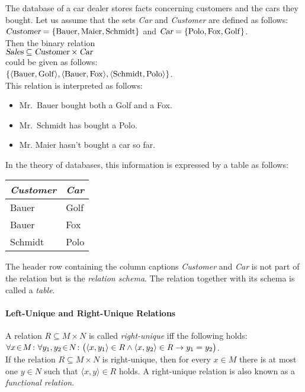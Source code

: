\example
The database of a car dealer stores facts concerning customers and the cars they bought.
Let us assume that the sets \textsl{Car} and \textsl{Customer} are defined as follows:
\\[0.2cm]
\hspace*{1.3cm}
$\textsl{Customer} = \{ \mathrm{Bauer}, \mathrm{Maier}, \mathrm{Schmidt} \}$
\quad and \quad
$\textsl{Car} = \{ \mathrm{Polo}, \mathrm{Fox}, \mathrm{Golf} \}$.
\\[0.2cm]
Then the binary relation 
\\[0.2cm]
\hspace*{1.3cm}
$\textsl{Sales} \subseteq \textsl{Customer} \times \textsl{Car}$
\\[0.2cm]
could be given as follows:
\\[0.2cm]
\hspace*{1.3cm}
$\{ \pair(\mathrm{Bauer}, \mathrm{Golf}), \pair(\mathrm{Bauer}, \mathrm{Fox}), \pair(\mathrm{Schmidt}, \mathrm{Polo})\}$.
\\[0.2cm]
This relation is interpreted as follows:
\begin{itemize}
\item Mr.~Bauer bought both a Golf and a Fox.
\item Mr.~Schmidt has bought a Polo.
\item Mr. Maier hasn't bought a car so far.
\end{itemize}
In the theory of databases, this information is expressed by a table as follows:
\begin{center}
  \begin{tabular}[c]{|l|l|}
\hline
\textsl{Customer} & \textsl{Car} \\
\hline
\hline
  Bauer   & Golf \\
\hline
  Bauer   & Fox  \\
\hline
  Schmidt & Polo \\
\hline
  \end{tabular}
\end{center}
The header row containing the column captions \textsl{Customer} and \textsl{Car}
is not part of the relation but is the  \emph{relation schema}.
The relation together with its schema is called a  \emph{table}.  


\paragraph{Left-Unique and Right-Unique Relations}
A relation $R \subseteq M \times N$ is called
\emph{right-unique} iff the following holds: \\[0.2cm]
\hspace*{1.3cm} 
$\forall x \!\in\! M \colon \forall y_1, y_2 \!\in\! N \colon \bigl(\langle x, y_1 \rangle \in R \wedge \langle x, y_2 \rangle \in R \rightarrow y_1 = y_2\bigr)$.
\\[0.2cm]
If the relation $R \subseteq M \times N$ is right-unique, then for every $x\in M$ there is
at most one  $y \in N$ such that $\langle x, y \rangle \in R$ holds.  
A right-unique relation is also known as a \emph{functional relation}.

